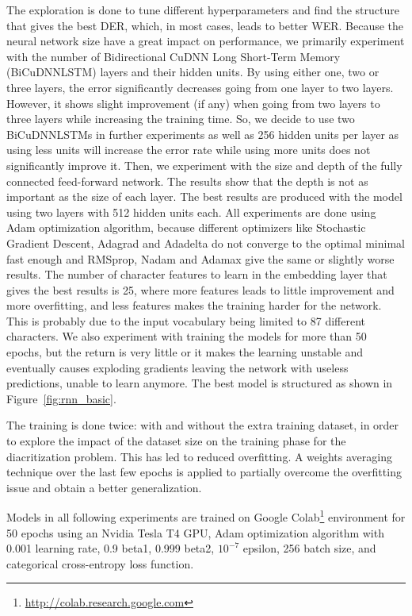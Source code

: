 \documentclass[11pt,a4paper]{article}
\begin{document}
The exploration is done to tune different hyperparameters and find the structure that gives the best DER, which, in most cases, leads to better WER. Because the neural network size have a great impact on performance, we primarily experiment with the number of Bidirectional CuDNN Long Short-Term Memory (BiCuDNNLSTM) \cite{appleyard2016optimizing} layers and their hidden units. By using either one, two or three layers, the error significantly decreases going from one layer to two layers. However, it shows slight improvement (if any) when going from two layers to three layers while increasing the training time. So, we decide to use two BiCuDNNLSTMs in further experiments as well as 256 hidden units per layer as using less units will increase the error rate while using more units does not significantly improve it.
Then, we experiment with the size and depth of the fully connected feed-forward network. The results show that the depth is not as important as the size of each layer. The best results are produced with the model using two layers with 512 hidden units each.
All experiments are done using Adam optimization algorithm, because different optimizers like Stochastic Gradient Descent, Adagrad and Adadelta do not converge to the optimal minimal fast enough and RMSprop, Nadam and Adamax give the same or slightly worse results.
The number of character features to learn in the embedding layer that gives the best results is 25, where more features leads to little improvement and more overfitting, and less features makes the training harder for the network. This is probably due to the input vocabulary being limited to 87 different characters.
We also experiment with training the models for more than 50 epochs, but the return is very little or it makes the learning unstable and eventually causes exploding gradients leaving the network with useless predictions, unable to learn anymore.
The best model is structured as shown in
Figure~\ref{fig:rnn_basic}.

The training is done twice: with and without the extra training dataset, in order to explore the impact of the dataset size on the training phase for the diacritization problem. This has led to reduced overfitting. A weights averaging technique over the last few epochs is applied to partially overcome the overfitting issue and obtain a better generalization.

Models in all following experiments are trained on Google Colab\footnote{\url{http://colab.research.google.com}} \cite{carneiro2018performance} environment for 50 epochs using an Nvidia Tesla T4 GPU, Adam  optimization algorithm with 0.001 learning rate, 0.9 beta1, 0.999 beta2, $10^{-7}$ epsilon, 256 batch size, and categorical cross-entropy loss function.
\end{document}
